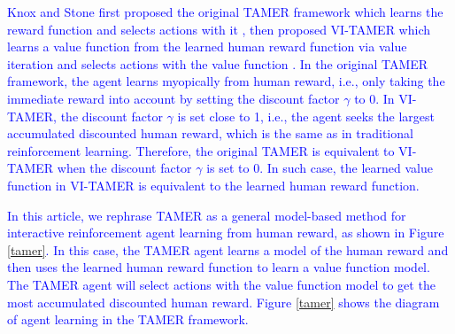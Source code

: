 \textcolor{blue}{Knox and Stone first proposed the original TAMER framework which learns the reward function and selects actions with it \cite{knox2009interactively}, then proposed VI-TAMER which learns a value function from the learned human reward function via value iteration and selects actions with the value function \cite{knox2015framing}. In the original TAMER framework, the agent learns myopically from human reward, i.e., only taking the immediate reward into account by setting the discount factor $\gamma$ to 0. In VI-TAMER, the discount factor $\gamma$ is set close to 1, i.e., the agent seeks the largest accumulated discounted human reward, which is the same as in traditional reinforcement learning. Therefore, the original TAMER is equivalent to VI-TAMER when the discount factor $\gamma$ is set to 0. %
In such case, the learned value function in VI-TAMER is equivalent to the learned human reward function.}

\textcolor{blue}{In this article, we rephrase TAMER as a general model-based method for interactive reinforcement agent learning from human reward, as shown in Figure \ref{tamer}. In this case, the TAMER agent learns a model of the human reward and then uses the learned human reward function to learn a value function model. The TAMER agent will select actions with the value function model to get the most accumulated discounted human reward. Figure \ref {tamer} shows the diagram of agent learning in the TAMER framework.}


